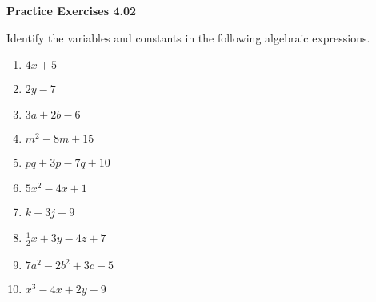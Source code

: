 \vspace{0.3ex}
\noindent\textbf{Practice Exercises 4.02}

\vspace{0.2ex}

Identify the variables and constants in the following algebraic expressions.
\begin{multicols}{2}				
\begin{enumerate}
    \item $4x + 5$  
    \item $2y - 7$  
    \item $3a + 2b - 6$  
    \item $m^2 - 8m + 15$  
    \item $pq + 3p - 7q + 10$  
    \item $5x^2 - 4x + 1$  
    \item $k - 3j + 9$  
    \item $\frac{1}{2}x + 3y - 4z + 7$  
    \item $7a^2 - 2b^2 + 3c - 5$  
    \item $x^3 - 4x + 2y - 9$  
\end{enumerate}
\end{multicols}

